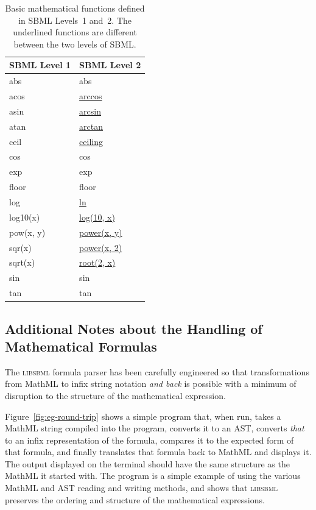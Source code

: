 \documentclass{sbmlmanual}
\newcommand{\libsbml}{\textsc{libsbml}}
\begin{document}
\begin{table}[bth]
  \small
  \centering
  \ttfamily
  \begin{tabular}{ll}
    \toprule
    \textrm{\textbf{SBML Level 1}} & \textrm{\textbf{SBML Level 2}} \\
    \midrule
    abs     & abs \\
    acos    & \underline{arccos} \\
    asin    & \underline{arcsin} \\
    atan    & \underline{arctan} \\
    ceil    & \underline{ceiling} \\
    cos     & cos \\
    exp     & exp \\
    floor   & floor \\
    log     & \underline{ln} \\
    log10(x) & \underline{log(10, x)} \\
    pow(x, y) &       \underline{power(x, y)} \\
    sqr(x)  & \underline{power(x, 2)} \\
    sqrt(x) & \underline{root(2, x)} \\
    sin     & sin \\
    tan     & tan \\
    \bottomrule
  \end{tabular}
  \caption{Basic mathematical functions defined in SBML Levels~1 and~2.
The underlined functions are different between the two levels of SBML.}
  \label{tab:function-names}
\end{table}

\subsection{Additional Notes about the Handling of Mathematical Formulas}
\label{sec:mathml-special-cases}

The \libsbml{} formula parser has been carefully engineered so that
transformations from MathML to infix string notation \emph{and back} is
possible with a minimum of disruption to the structure of the mathematical
expression.

Figure~\vref{fig:eg-round-trip} shows a simple program that, when run,
takes a MathML string compiled into the program, converts it to an AST,
converts \emph{that} to an infix representation of the formula, compares it
to the expected form of that formula, and finally translates that formula
back to MathML and displays it.  The output displayed on the terminal
should have the same structure as the MathML it started with.  The program
is a simple example of using the various MathML and AST reading and writing
methods, and shows that \libsbml{} preserves the ordering and structure of
the mathematical expressions.
\end{document}
